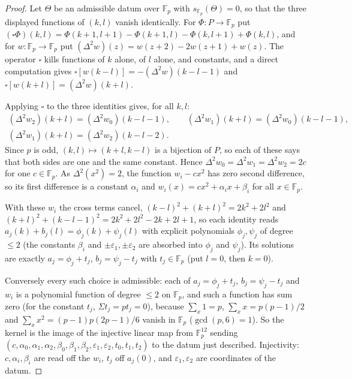 \documentclass[11pt]{article}
\theoremstyle{definition}
\theoremstyle{remark}
\newcommand{\F}{\mathbb{F}}
\begin{document}
\begin{proof}
Let $\Theta$ be an admissible datum over $\F_p$ with $s_{\F_p}(\Theta)=0$, so that the three displayed functions of $(k,l)$ vanish identically. For $\Phi:P\to\F_p$ put $(\square\Phi)(k,l)=\Phi(k+1,l+1)-\Phi(k+1,l)-\Phi(k,l+1)+\Phi(k,l)$, and for $w:\F_p\to\F_p$ put $(\Delta^2w)(z)=w(z+2)-2w(z+1)+w(z)$. The operator $\square$ kills functions of $k$ alone, of $l$ alone, and constants, and a direct computation gives $\square[w(k-l)]=-(\Delta^2w)(k-l-1)$ and $\square[w(k+l)]=(\Delta^2w)(k+l)$.

Applying $\square$ to the three identities gives, for all $k,l$:
\begin{gather*}
(\Delta^2w_2)(k+l)=(\Delta^2w_0)(k-l-1),\qquad (\Delta^2w_1)(k+l)=(\Delta^2w_0)(k-l-1),\\ (\Delta^2w_1)(k+l)=(\Delta^2w_2)(k-l-2).
\end{gather*}
Since $p$ is odd, $(k,l)\mapsto(k+l,k-l)$ is a bijection of $P$, so each of these says that both sides are one and the same constant. Hence $\Delta^2w_0=\Delta^2w_1=\Delta^2w_2=2c$ for one $c\in\F_p$. As $\Delta^2(x^2)=2$, the function $w_i-cx^2$ has zero second difference, so its first difference is a constant $\alpha_i$ and $w_i(x)=cx^2+\alpha_ix+\beta_i$ for all $x\in\F_p$.

With these $w_i$ the cross terms cancel, $(k-l)^2+(k+l)^2=2k^2+2l^2$ and $(k+l)^2+(k-l-1)^2=2k^2+2l^2-2k+2l+1$, so each identity reads $a_j(k)+b_j(l)=\phi_j(k)+\psi_j(l)$ with explicit polynomials $\phi_j,\psi_j$ of degree $\le2$ (the constants $\beta_i$ and $\pm\varepsilon_1,\pm\varepsilon_2$ are absorbed into $\phi_j$ and $\psi_j$). Its solutions are exactly $a_j=\phi_j+t_j$, $b_j=\psi_j-t_j$ with $t_j\in\F_p$ (put $l=0$, then $k=0$).

Conversely every such choice is admissible: each of $a_j=\phi_j+t_j$, $b_j=\psi_j-t_j$ and $w_i$ is a polynomial function of degree $\le2$ on $\F_p$, and such a function has sum zero (for the constant $t_j$, $\Sigma t_j=pt_j=0$), because $\sum_x1=p$, $\sum_xx=p(p-1)/2$ and $\sum_xx^2=(p-1)p(2p-1)/6$ vanish in $\F_p$ ($\gcd(p,6)=1$). So the kernel is the image of the injective linear map from $\F_p^{12}$ sending $(c,\alpha_0,\alpha_1,\alpha_2,\beta_0,\beta_1,\beta_2,\varepsilon_1,\varepsilon_2,t_0,t_1,t_2)$ to the datum just described. Injectivity: $c,\alpha_i,\beta_i$ are read off the $w_i$, $t_j$ off $a_j(0)$, and $\varepsilon_1,\varepsilon_2$ are coordinates of the datum.
\end{proof}
\end{document}
